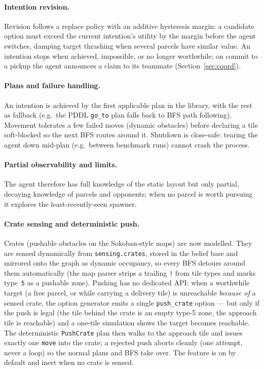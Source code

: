 \paragraph{Intention revision.} Revision follows a replace policy with an
additive hysteresis margin: a candidate option must exceed the current
intention's utility by the margin before the agent switches, damping
target thrashing when several parcels have similar value. An intention stops
when achieved, impossible, or no longer worthwhile; on commit to a pickup the
agent announces a claim to its teammate (Section~\ref{sec:coord}).

\paragraph{Plans and failure handling.} An intention is achieved by the first
applicable plan in the library, with the rest as fallback (e.g.\ the PDDL
\texttt{go\_to} plan falls back to BFS path following). Movement tolerates a few
failed moves (dynamic obstacles) before declaring a tile soft-blocked so the
next BFS routes around it. Shutdown is close-safe: tearing the agent down
mid-plan (e.g.\ between benchmark runs) cannot crash the process.

\paragraph{Partial observability and limits.} The agent therefore has full
knowledge of the static layout but only partial, decaying knowledge of parcels
and opponents; when no parcel is worth pursuing it explores the
least-recently-seen spawner.

\paragraph{Crate sensing and deterministic push.} Crates (pushable obstacles
on the Sokoban-style maps) are now modelled. They are sensed dynamically from
\texttt{sensing.crates}, stored in the belief base and mirrored onto the graph
as dynamic occupancy, so every BFS detours around them automatically (the map
parser strips a trailing \texttt{!} from tile types and marks type~\texttt{5}
as a pushable zone). Pushing has no dedicated API: when a worthwhile target (a
free parcel, or while carrying a delivery tile) is unreachable \emph{because of}
a sensed crate, the option generator emits a single \texttt{push\_crate} option
--- but only if the push is legal (the tile behind the crate is an empty
type-5 zone, the approach tile is reachable) and a one-tile simulation shows the
target becomes reachable. The deterministic \texttt{PushCrate} plan then walks
to the approach tile and issues exactly one \texttt{move} into the crate; a
rejected push aborts cleanly (one attempt, never a loop) so the normal plans and
BFS take over. The feature is on by default and inert when no crate is sensed.
